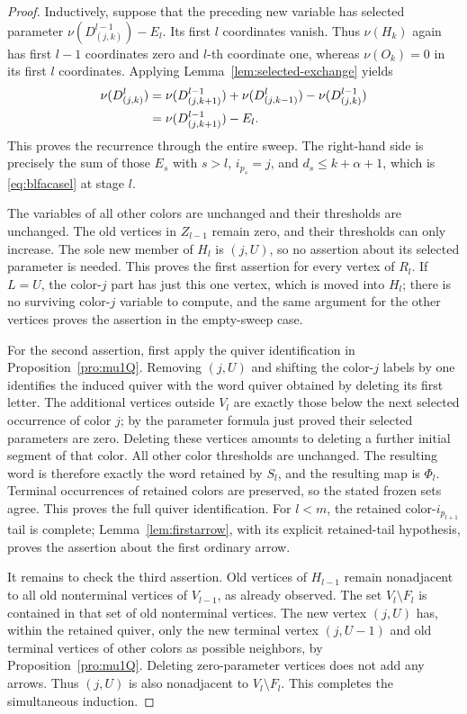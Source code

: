 \documentclass[12pt, reqno]{amsart}
\theoremstyle{plain}
\theoremstyle{definition}
\numberwithin{equation}{section}
\begin{document}
\begin{proof}
Inductively, suppose that the preceding new variable has selected
parameter \(\nu(D^{l-1}_{(j,k)})-E_l\). Its first \(l\)
coordinates vanish. Thus \(\nu(H_k)\) again has first \(l-1\)
coordinates zero and \(l\)-th coordinate one, whereas
\(\nu(O_k)=0\) in its first \(l\) coordinates. Applying
Lemma~\ref{lem:selected-exchange} yields
\begin{align}
 \nu(D^l_{(j,k)})
 &=\nu(D^{l-1}_{(j,k+1)})+\nu(D^l_{(j,k-1)})
       -\nu(D^{l-1}_{(j,k)})\notag\\
 &=\nu(D^{l-1}_{(j,k+1)})-E_l.
 \label{eq:induction-recurrence-general}
\end{align}
This proves the recurrence through the entire sweep. The right-hand
side is precisely the sum of those \(E_s\) with
\(s>l\), \(i_{p_s}=j\), and \(d_s\leq k+\alpha+1\), which is
\eqref{eq:blfacasel} at stage \(l\).

The variables of all other colors are unchanged and their thresholds
are unchanged. The old vertices in \(Z_{l-1}\) remain zero, and their
thresholds can only increase. The sole new member of \(H_l\) is
\((j,U)\), so no assertion about its selected parameter is needed.
This proves the first assertion for every vertex of \(R_l\).
If \(L=U\), the color-\(j\) part has just this one vertex, which is
moved into \(H_l\); there is no surviving color-\(j\) variable to
compute, and the same argument for the other vertices proves the
assertion in the empty-sweep case.

For the second assertion, first apply the quiver identification in
Proposition~\ref{pro:mu1Q}. Removing \((j,U)\) and shifting the
color-\(j\) labels by one identifies the induced quiver with the word
quiver obtained by deleting its first letter. The additional vertices
outside \(V_l\) are exactly those below the next selected occurrence
of color \(j\); by the parameter formula just proved their selected
parameters are zero. Deleting these vertices amounts to deleting a
further initial segment of that color. All other color thresholds
are unchanged. The resulting word is therefore exactly the word
retained by \(S_l\), and the resulting map is \(\Phi_l\).
Terminal occurrences of retained colors are preserved, so the stated
frozen sets agree. This proves the full quiver identification.
For \(l<m\), the retained color-\(i_{p_{l+1}}\) tail is complete;
Lemma~\ref{lem:firstarrow}, with its explicit retained-tail hypothesis,
proves the assertion about the first ordinary arrow.

It remains to check the third assertion. Old vertices of \(H_{l-1}\)
remain nonadjacent to all old nonterminal vertices of \(V_{l-1}\),
as already observed. The set \(V_l\setminus F_l\) is contained in
that set of old nonterminal vertices. The new vertex \((j,U)\) has,
within the retained quiver, only the new terminal vertex \((j,U-1)\)
and old terminal vertices of other colors as possible neighbors,
by Proposition~\ref{pro:mu1Q}. Deleting zero-parameter vertices does
not add any arrows. Thus \((j,U)\) is also nonadjacent to
\(V_l\setminus F_l\). This completes the simultaneous induction.


\end{proof}
\end{document}
